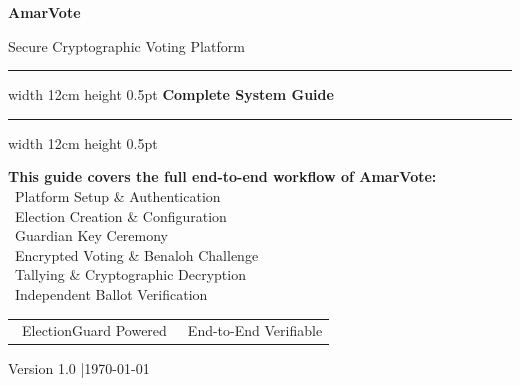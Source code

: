 \documentclass[12pt,a4paper,openany]{book}
\begin{document}
\begin{titlepage}
	\pagecolor{coverbg}
	\color{white}
	\centering
	\vspace*{2cm}

	{\fontsize{60}{65}\selectfont\bfseries AmarVote}

	\vspace{0.5cm}
	{\Large\color{accentteal} Secure Cryptographic Voting Platform}

	\vspace{1.5cm}
	\hrule width 12cm height 0.5pt
	\vspace{0.4cm}
	{\LARGE\bfseries Complete System Guide}
	\vspace{0.4cm}
	\hrule width 12cm height 0.5pt

	\vspace{2cm}

	\begin{tcolorbox}[
			enhanced, width=10cm,
			colback=primaryblue!80!black, colframe=accentteal,
			arc=6pt, boxrule=1.5pt,
			left=12pt, right=12pt, top=10pt, bottom=10pt
		]
		\centering\color{white}
		\textbf{This guide covers the full end-to-end workflow of AmarVote:}\\[6pt]
		\textcolor{accentteal}{\faUser} \, Platform Setup \& Authentication\\[4pt]
		\textcolor{accentteal}{\faCog} \, Election Creation \& Configuration\\[4pt]
		\textcolor{accentteal}{\faKey} \, Guardian Key Ceremony\\[4pt]
		\textcolor{accentteal}{\faVoteYea} \, Encrypted Voting \& Benaloh Challenge\\[4pt]
		\textcolor{accentteal}{\faCalculator} \, Tallying \& Cryptographic Decryption\\[4pt]
		\textcolor{accentteal}{\faCheckDouble} \, Independent Ballot Verification
	\end{tcolorbox}

	\vfill

	\begin{tabular}{cc}
		\textcolor{accentteal}{\faLock} \, ElectionGuard Powered &
		\textcolor{accentteal}{\faLock} \, End-to-End Verifiable
	\end{tabular}

	\vspace{1cm}
	{\small Version 1.0 \quad|\quad \today}
\end{titlepage}
\nopagecolor
\color{black}
\end{document}
